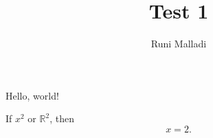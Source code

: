 \documentclass[12pt]{article}
\title{Test 1}
\author{Runi Malladi}
\begin{document}
\maketitle

Hello, world!

If $x^2$ or $\mathbb{R}^2$, then 
\begin{equation}
	x=2.
\end{equation}
\end{document}
